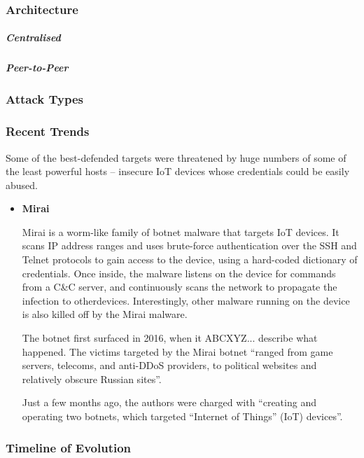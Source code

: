 \subsubsection{Architecture}
\subparagraph{Centralised}
\subparagraph{Peer-to-Peer}

\subsubsection{Attack Types}


\subsubsection{Recent Trends}


Some of the best-defended targets were threatened by huge numbers of some of the least powerful hosts – insecure IoT devices whose credentials could be easily abused.

\begin{itemize}
	\item \textbf{Mirai}
	
	Mirai is a worm-like family of botnet malware that targets IoT devices. It scans IP address ranges and uses brute-force authentication over the SSH and Telnet protocols to gain access to the device, using a hard-coded dictionary of credentials. Once inside, the malware listens on the device for commands from a C&C server, and continuously scans the network to propagate the infection to otherdevices. Interestingly, other malware running on the device is also killed off by the Mirai malware. 
	
	The botnet first surfaced in 2016, when it {ABCXYZ... describe what happened}. The victims targeted by the Mirai botnet “ranged from game servers, telecoms, and anti-DDoS providers, to political websites and relatively obscure Russian sites”.
		
	Just a few months ago, the authors were charged with “creating and operating two botnets, which targeted “Internet of Things” (IoT) devices”.
\end{itemize}

\subsubsection{Timeline of Evolution}






